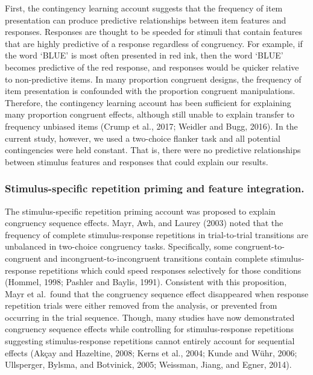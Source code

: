\documentclass[]{DissertateCUNY}
\begin{document}
First, the contingency learning account suggests that the frequency of
item presentation can produce predictive relationships between item
features and responses. Responses are thought to be speeded for stimuli
that contain features that are highly predictive of a response
regardless of congruency. For example, if the word `BLUE' is most often
presented in red ink, then the word `BLUE' becomes predictive of the red
response, and responses would be quicker relative to non-predictive
items. In many proportion congruent designs, the frequency of item
presentation is confounded with the proportion congruent manipulations.
Therefore, the contingency learning account has been sufficient for
explaining many proportion congruent effects, although still unable to
explain transfer to frequency unbiased items (Crump et al., 2017;
Weidler and Bugg, 2016). In the current study, however, we used a
two-choice flanker task and all potential contingencies were held
constant. That is, there were no predictive relationships between
stimulus features and responses that could explain our results.

\hypertarget{stimulus-specific-repetition-priming-and-feature-integration.}{%
\subsubsection{Stimulus-specific repetition priming and feature
integration.}\label{stimulus-specific-repetition-priming-and-feature-integration.}}

The stimulus-specific repetition priming account was proposed to explain
congruency sequence effects. Mayr, Awh, and Laurey (2003) noted that the
frequency of complete stimulus-response repetitions in trial-to-trial
transitions are unbalanced in two-choice congruency tasks. Specifically,
some congruent-to-congruent and incongruent-to-incongruent transitions
contain complete stimulus-response repetitions which could speed
responses selectively for those conditions (Hommel, 1998; Pashler and
Baylis, 1991). Consistent with this proposition, Mayr et al.~found that
the congruency sequence effect disappeared when response repetition
trials were either removed from the analysis, or prevented from
occurring in the trial sequence. Though, many studies have now
demonstrated congruency sequence effects while controlling for
stimulus-response repetitions suggesting stimulus-response repetitions
cannot entirely account for sequential effects (Akçay and Hazeltine,
2008; Kerns et al., 2004; Kunde and Wühr, 2006; Ullsperger, Bylsma, and
Botvinick, 2005; Weissman, Jiang, and Egner, 2014).
\end{document}
